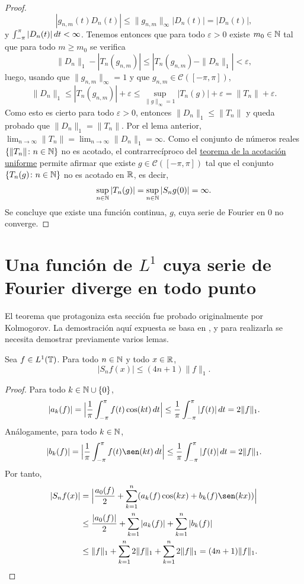 \documentclass[a4paper, 12pt]{book}
\begin{document}
\begin{proof}
    \[|g_{n,m}(t) D_n(t)| \le \|g_{n,m}\|_\infty |D_n(t)| = |D_n(t)|,\]
    y $\int_{-\pi}^{\pi} |D_n(t)| \, dt < \infty$. Tenemos entonces que para todo $\varepsilon >0$ existe $m_0 \in \mathbb N$ tal que para todo $m \geq m_0$ se verifica
    \[\|D_n\|_1 - |T_n(g_{n,m})| \leq  |T_n(g_{n,m}) - \|D_n\|_1| < \varepsilon,\]
    luego, usando que $\|g_{n,m}\|_\infty = 1$ y que $g_{n,m}\in\mathcal{C}([-\pi,\pi])$,
    \[\|D_n\|_1 \leq |T_n(g_{n,m})| + \varepsilon \leq \sup_{\|g\|_\infty = 1} |T_n(g)| + \varepsilon = \|T_n\| + \varepsilon.\]
    Como esto es cierto para todo $\varepsilon > 0$, entonces $\|D_n\|_1 \leq \|T_n\|$ y queda probado que $\|D_n\|_1 = \|T_n\|$. Por el lema anterior, $\lim_{n \to \infty} \|T_n\| = \lim_{n \to \infty} \|D_n\|_1 = \infty$. Como el conjunto de números reales $\{\|T_n\| \colon n \in \mathbb N\}$ no es acotado, el contrarrecíproco del \hyperref[1.3.1]{teorema de la acotación uniforme} permite afirmar que existe $g \in \mathcal{C}([-\pi,\pi])$ tal que el conjunto $\{T_n(g) \colon n \in \mathbb N\}$ no es acotado en $\mathbb R$, es decir,
    \[\sup_{n \in \mathbb N} |T_n(g)| = \sup_{n \in \mathbb N} |S_ng(0)|= \infty.\]
    Se concluye que existe una función continua, $g$, cuya serie de Fourier en $0$ no converge.
\end{proof}

\section[Una función de \texorpdfstring{$L^1$}{L1} cuya serie de Fourier diverge en todo punto]{Una función de \texorpdfstring{\boldmath$L^1$}{L1} cuya serie de Fourier diverge en todo punto}

El teorema que protagoniza esta sección fue probado originalmente por Kolmogorov. La demostración aquí expuesta se basa en \cite{zygmund}, y para realizarla se necesita demostrar previamente varios lemas.

\begin{lemma}\label{2.2.1}
    Sea $f \in L^1(\mathbb T)$. Para todo $n \in \mathbb N$ y todo $x \in \mathbb R$,
    \[|S_nf(x)| \leq (4n+1)\|f\|_{1}.\]
\end{lemma}

\begin{proof}
    Para todo $k \in \mathbb N \cup \{0\}$,
    \[|a_k(f)| = \Bigl|\frac{1}{\pi}\int_{-\pi}^{\pi} f(t)\cos(kt) \, dt\Bigr| \leq \frac{1}{\pi}\int_{-\pi}^{\pi} |f(t)| \, dt = 2\|f\|_{1}.\]
    Análogamente, para todo $k \in \mathbb N$,
    \[|b_k(f)| = \Bigl|\frac{1}{\pi}\integral{-\pi}{\pi}{f(t)\sen(kt)}\Bigr| \leq \frac{1}{\pi}\integral{-\pi}{\pi}{|f(t)|} = 2\|f\|_{1}.\]
    Por tanto,
    \begin{align*}
        |S_nf(x)| &= \Bigl|\frac{a_0(f)}{2}+\sum_{k=1}^n (a_k(f)\cos(kx)+b_k(f)\sen(kx))\Bigr| \\
        &\leq \frac{|a_0(f)|}{2}+\sum_{k=1}^n|a_k(f)|+\sum_{k=1}^n|b_k(f)| \\
        &\leq \|f\|_{1}+\sum_{k=1}^n2\|f\|_{1}+\sum_{k=1}^n 2\|f\|_{1} =(4n+1)\|f\|_{1}. \qedhere
    \end{align*}
\end{proof}
\end{document}
